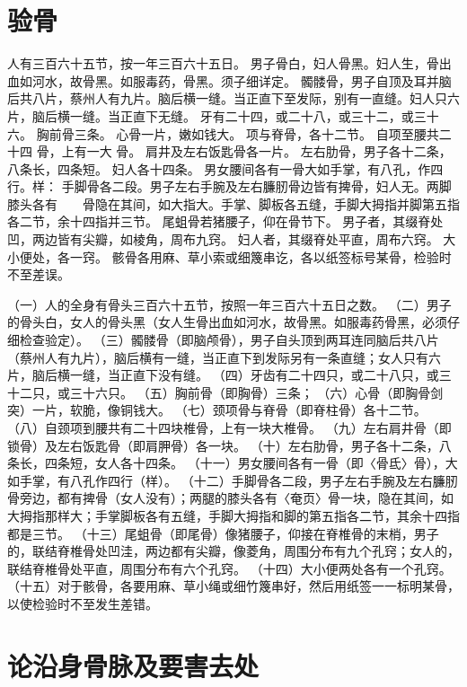 \documentclass[12pt,UTF8]{ctexbook}
\begin{document}
\chapter{验骨}

人有三百六十五节，按一年三百六十五日。
男子骨白，妇人骨黑。妇人生，骨出血如河水，故骨黑。如服毒药，骨黑。须子细详定。
髑髅骨，男子自顶及耳并脑后共八片，蔡州人有九片。脑后横一缝。当正直下至发际，别有一直缝。妇人只六片，脑后横一缝。当正直下无缝。
牙有二十四，或二十八，或三十二，或三十六。
胸前骨三条。
心骨一片，嫩如钱大。
项与脊骨，各十二节。
自项至腰共二十四 骨，上有一大 骨。
肩井及左右饭匙骨各一片。
左右肋骨，男子各十二条，八条长，四条短。
妇人各十四条。
男女腰间各有一骨大如手掌，有八孔，作四行。样：
手脚骨各二段。男子左右手腕及左右臁肕骨边皆有捭骨，妇人无。两脚膝头各有　　骨隐在其间，如大指大。手掌、脚板各五缝，手脚大拇指并脚第五指各二节，余十四指并三节。
尾蛆骨若猪腰子，仰在骨节下。
男子者，其缀脊处凹，两边皆有尖瓣，如棱角，周布九窍。
妇人者，其缀脊处平直，周布六窍。
大小便处，各一窍。
骸骨各用麻、草小索或细篾串讫，各以纸签标号某骨，检验时不至差误。


（一）人的全身有骨头三百六十五节，按照一年三百六十五日之数。
（二）男子的骨头白，女人的骨头黑（女人生骨出血如河水，故骨黑。如服毒药骨黑，必须仔细检查验定）。
（三）髑髅骨（即脑颅骨），男子自头顶到两耳连同脑后共八片（蔡州人有九片），脑后横有一缝，当正直下到发际另有一条直缝；女人只有六片，脑后横一缝，当正直下没有缝。
（四）牙齿有二十四只，或二十八只，或三十二只，或三十六只。
（五）胸前骨（即胸骨）三条；
（六）心骨（即胸骨剑突）一片，软脆，像铜钱大。
（七）颈项骨与脊骨（即脊柱骨）各十二节。
（八）自颈项到腰共有二十四块椎骨，上有一块大椎骨。
（九）左右肩井骨（即锁骨）及左右饭匙骨（即肩胛骨）各一块。
（十）左右肋骨，男子各十二条，八条长，四条短，女人各十四条。
（十一）男女腰间各有一骨（即〈骨氐〉骨），大如手掌，有八孔作四行（样）。
（十二）手脚骨各二段，男子左右手腕及左右臁肕骨旁边，都有捭骨（女人没有）；两腿的膝头各有〈奄页〉骨一块，隐在其间，如大拇指那样大；手掌脚板各有五缝，手脚大拇指和脚的第五指各二节，其余十四指都是三节。
（十三）尾蛆骨（即尾骨）像猪腰子，仰接在脊椎骨的末梢，男子的，联结脊椎骨处凹洼，两边都有尖瓣，像菱角，周围分布有九个孔窍；女人的，联结脊椎骨处平直，周围分布有六个孔窍。
（十四）大小便两处各有一个孔窍。
（十五）对于骸骨，各要用麻、草小绳或细竹篾串好，然后用纸签一一标明某骨，以使检验时不至发生差错。


\chapter{论沿身骨脉及要害去处}
\end{document}
